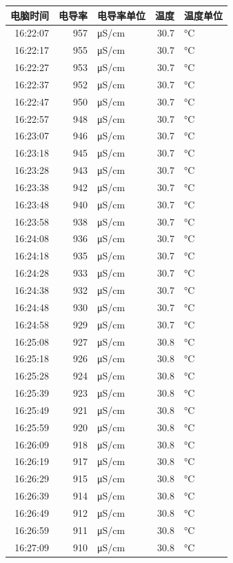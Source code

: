 \documentclass[11pt]{article}
\begin{document}
\begin{enumerate}
\begin{center}
\begin{tabular}{rrlrl}
电脑时间 & 电导率 & 电导率单位 & 温度 & 温度单位\\
\hline
16:22:07 & 957 & μS/cm & 30.7 & °C\\
16:22:17 & 955 & μS/cm & 30.7 & °C\\
16:22:27 & 953 & μS/cm & 30.7 & °C\\
16:22:37 & 952 & μS/cm & 30.7 & °C\\
16:22:47 & 950 & μS/cm & 30.7 & °C\\
16:22:57 & 948 & μS/cm & 30.7 & °C\\
16:23:07 & 946 & μS/cm & 30.7 & °C\\
16:23:18 & 945 & μS/cm & 30.7 & °C\\
16:23:28 & 943 & μS/cm & 30.7 & °C\\
16:23:38 & 942 & μS/cm & 30.7 & °C\\
16:23:48 & 940 & μS/cm & 30.7 & °C\\
16:23:58 & 938 & μS/cm & 30.7 & °C\\
16:24:08 & 936 & μS/cm & 30.7 & °C\\
16:24:18 & 935 & μS/cm & 30.7 & °C\\
16:24:28 & 933 & μS/cm & 30.7 & °C\\
16:24:38 & 932 & μS/cm & 30.7 & °C\\
16:24:48 & 930 & μS/cm & 30.7 & °C\\
16:24:58 & 929 & μS/cm & 30.7 & °C\\
16:25:08 & 927 & μS/cm & 30.8 & °C\\
16:25:18 & 926 & μS/cm & 30.8 & °C\\
16:25:28 & 924 & μS/cm & 30.8 & °C\\
16:25:39 & 923 & μS/cm & 30.8 & °C\\
16:25:49 & 921 & μS/cm & 30.8 & °C\\
16:25:59 & 920 & μS/cm & 30.8 & °C\\
16:26:09 & 918 & μS/cm & 30.8 & °C\\
16:26:19 & 917 & μS/cm & 30.8 & °C\\
16:26:29 & 915 & μS/cm & 30.8 & °C\\
16:26:39 & 914 & μS/cm & 30.8 & °C\\
16:26:49 & 912 & μS/cm & 30.8 & °C\\
16:26:59 & 911 & μS/cm & 30.8 & °C\\
16:27:09 & 910 & μS/cm & 30.8 & °C\\

\end{tabular}
\end{center}
\end{enumerate}
\end{document}
